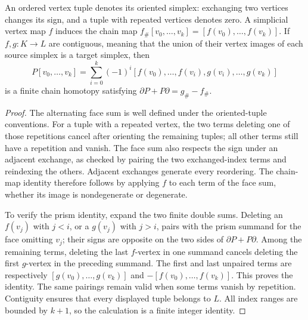 \begin{proposition}
\label{prop:simplicial-prism}
An ordered vertex tuple denotes its oriented simplex: exchanging two
vertices changes its sign, and a tuple with repeated vertices denotes
zero.  A simplicial vertex map $f$ induces the chain map
$f_\#[v_0,\ldots,v_k]=[f(v_0),\ldots,f(v_k)]$.
If $f,g:K\to L$ are contiguous, meaning that the union of their vertex
images of each source simplex is a target simplex, then
\[
 P[v_0,\ldots,v_k]
 =\sum_{i=0}^{k}(-1)^i
 [f(v_0),\ldots,f(v_i),g(v_i),\ldots,g(v_k)]
\]
is a finite chain homotopy satisfying
$\partial P+P\partial=g_\#-f_\#$.
\end{proposition}
\begin{proof}
The alternating face sum is well defined under the oriented-tuple
conventions.  For a tuple with a repeated vertex, the two terms deleting
one of those repetitions cancel after orienting the remaining tuples;
all other terms still have a repetition and vanish.  The face sum also
respects the sign under an adjacent exchange, as checked by pairing the
two exchanged-index terms and reindexing the others.  Adjacent exchanges
generate every reordering.  The chain-map identity therefore follows
by applying $f$ to each term of the face sum, whether its image is
nondegenerate or degenerate.

To verify the prism identity, expand the two finite double sums.
Deleting an $f(v_j)$ with $j<i$, or a $g(v_j)$ with $j>i$, pairs with the
prism summand for the face omitting $v_j$; their signs are opposite on
the two sides of $\partial P+P\partial$.  Among the remaining terms,
deleting the last $f$-vertex in one summand cancels deleting the first
$g$-vertex in the preceding summand.  The first and last unpaired terms
are respectively $[g(v_0),\ldots,g(v_k)]$ and
$-[f(v_0),\ldots,f(v_k)]$.  This proves the identity.  The same
pairings remain valid when some terms vanish by repetition.  Contiguity
ensures that every displayed tuple belongs to $L$.  All index ranges
are bounded by $k+1$, so the calculation is a finite integer identity.
\end{proof}


